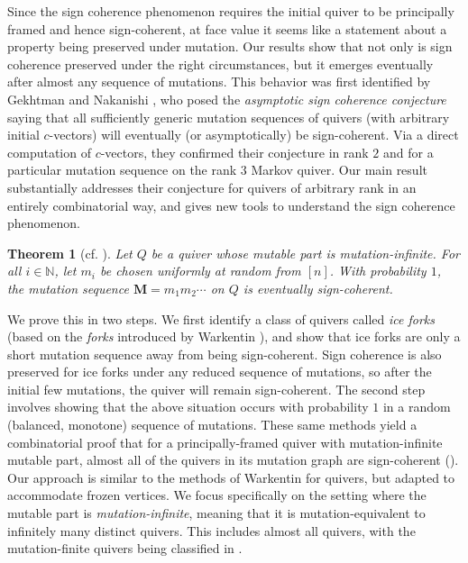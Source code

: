 \documentclass[12pt]{amsart}
\newtheorem{thm}{Theorem}[section]
\theoremstyle{definition}
\theoremstyle{remark}
\numberwithin{equation}{section}
\newcommand{\N} { \mathbb{N}}
\begin{document}



Since the sign coherence phenomenon requires the initial quiver to be principally framed and hence sign-coherent, at face value it seems like a statement about a property being preserved under mutation.  Our results show that not only is sign coherence preserved under the right circumstances, but it emerges eventually after almost any sequence of mutations.  This behavior was first identified by Gekhtman and Nakanishi \cite[{cf. }]{GekhtmanNakanishi}, who posed the \emph{asymptotic sign coherence conjecture} saying that all sufficiently generic mutation sequences of quivers (with arbitrary initial $c$-vectors) will eventually (or asymptotically) be sign-coherent. Via a direct computation of $c$-vectors, they confirmed their conjecture in rank $2$ and for a particular mutation sequence on the rank $3$ Markov quiver. Our main result substantially addresses their conjecture for quivers of arbitrary rank in an entirely combinatorial way, and gives new tools to understand the sign coherence phenomenon. 

\begin{thm}[{cf. }]
\label{thm: intro main}
Let $Q$ be a quiver whose mutable part is mutation-infinite.  For all $i \in \N$, let $m_i$ be chosen uniformly at random from $[n]$.  With probability $1$, the mutation sequence $\mathbf M = m_1m_2\cdots$ on $Q$ is eventually sign-coherent.
\end{thm}

 We prove this in two steps. We first identify a class of quivers called \emph{ice forks} (based on the \emph{forks} introduced by Warkentin \cite{Warkentin}), and show that ice forks are only a short mutation sequence away from being sign-coherent. Sign coherence is also preserved for ice forks under any reduced sequence of mutations, so after the initial few mutations, the quiver will remain sign-coherent. 
The second step involves showing that the above situation occurs with probability $1$ in a random (balanced, monotone) sequence of mutations.   These same methods yield a combinatorial proof that for a principally-framed quiver with mutation-infinite mutable part, almost all of the quivers in its mutation graph are sign-coherent ().  Our approach is similar to the methods of Warkentin \cite[Chapter 5] {Warkentin} for quivers, but adapted to accommodate frozen vertices.  We focus specifically on the setting where the mutable part is \emph{mutation-infinite}, meaning that it is mutation-equivalent to infinitely many distinct quivers. This includes almost all quivers, with the mutation-finite quivers being classified in \cite{FST}. 
\end{document}
